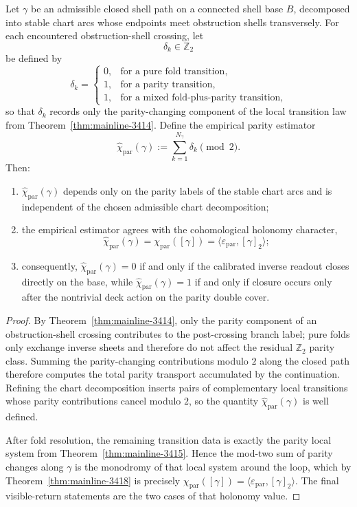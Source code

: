 \begin{theorem}
\label{thm:mainline-3419}
Let $\gamma$ be an admissible closed shell path on a connected shell base $B$, decomposed into stable chart arcs whose endpoints meet obstruction shells transversely. For each encountered obstruction-shell crossing, let
\[
  \delta_k\in\mathbb Z_2
\]
be defined by
\[
  \delta_k=
  \begin{cases}
    0,&\text{for a pure fold transition},\\
    1,&\text{for a parity transition},\\
    1,&\text{for a mixed fold-plus-parity transition},
  \end{cases}
\]
so that $\delta_k$ records only the parity-changing component of the local transition law from Theorem~\ref{thm:mainline-3414}. Define the empirical parity estimator
\[
  \widehat\chi_{\mathrm{par}}(\gamma)
  :=
  \sum_{k=1}^{N_\gamma}\delta_k \pmod 2.
\]
Then:
\begin{enumerate}[label=(\roman*)]
  \item $\widehat\chi_{\mathrm{par}}(\gamma)$ depends only on the parity labels of the stable chart arcs and is independent of the chosen admissible chart decomposition;
  \item the empirical estimator agrees with the cohomological holonomy character,
  \[
    \widehat\chi_{\mathrm{par}}(\gamma)
    =
    \chi_{\mathrm{par}}([\gamma])
    =
    \langle \varepsilon_{\mathrm{par}},[\gamma]_2\rangle;
  \]
  \item consequently, $\widehat\chi_{\mathrm{par}}(\gamma)=0$ if and only if the calibrated inverse readout closes directly on the base, while $\widehat\chi_{\mathrm{par}}(\gamma)=1$ if and only if closure occurs only after the nontrivial deck action on the parity double cover.
\end{enumerate}
\end{theorem}

\begin{proof}
By Theorem~\ref{thm:mainline-3414}, only the parity component of an obstruction-shell crossing contributes to the post-crossing branch label; pure folds only exchange inverse sheets and therefore do not affect the residual $\mathbb Z_2$ parity class. Summing the parity-changing contributions modulo $2$ along the closed path therefore computes the total parity transport accumulated by the continuation. Refining the chart decomposition inserts pairs of complementary local transitions whose parity contributions cancel modulo $2$, so the quantity $\widehat\chi_{\mathrm{par}}(\gamma)$ is well defined.

After fold resolution, the remaining transition data is exactly the parity local system from Theorem~\ref{thm:mainline-3415}. Hence the mod-two sum of parity changes along $\gamma$ is the monodromy of that local system around the loop, which by Theorem~\ref{thm:mainline-3418} is precisely $\chi_{\mathrm{par}}([\gamma])=\langle \varepsilon_{\mathrm{par}},[\gamma]_2\rangle$. The final visible-return statements are the two cases of that holonomy value.
\end{proof}

